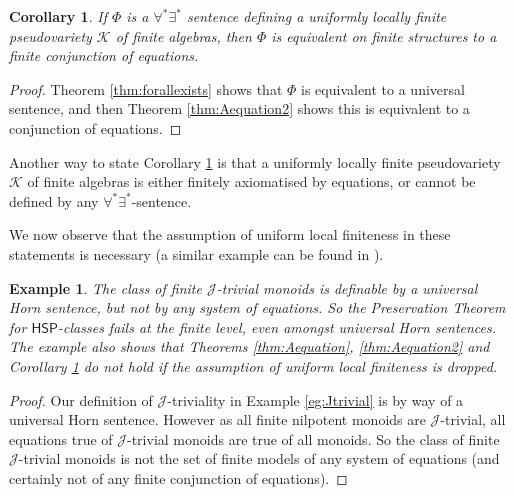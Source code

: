 \documentclass[reqno]{amsart}
\theoremstyle{plain}
\newtheorem{cor}[thm]{Corollary}
\newtheorem{eg}[thm]{Example}
\theoremstyle{definition}
\begin{document}
\begin{cor}\label{cor:compton}
If $\Phi$ is a $\forall^*\exists^*$ sentence defining a uniformly locally finite pseudovariety $\mathscr{K}$ of finite algebras, 
then $\Phi$ is equivalent on finite structures to a finite conjunction of equations.
\end{cor}
\begin{proof}
Theorem \ref{thm:forallexists} shows that $\Phi$ is equivalent to a universal sentence, and then Theorem  \ref{thm:Aequation2} shows this is equivalent to a conjunction of equations.
\end{proof}
Another way to state Corollary \ref{cor:compton} is that a uniformly locally finite pseudovariety~$\mathscr{K}$ of finite algebras is either finitely axiomatised by equations, or cannot be defined by any $\forall^*\exists^*$-sentence.


We now observe that the assumption of uniform local finiteness in these statements is necessary (a similar example can be found in \cite{rosen}).
\begin{eg}\label{eg:Jtrivial2}
The class of finite $\mathcal{J}$-trivial monoids is definable by a universal Horn sentence, but not by any system of equations.  So the Preservation Theorem for $\mathsf{HSP}$-classes fails at the finite level, even amongst universal Horn sentences.  The example also shows that Theorems \ref{thm:Aequation}, \ref{thm:Aequation2} and Corollary \ref{cor:compton} do not hold if the assumption of uniform local finiteness is dropped.
\end{eg}
\begin{proof}
Our definition of $\mathcal{J}$-triviality in Example \ref{eg:Jtrivial} is by way of a universal Horn sentence.  However as all finite nilpotent monoids are $\mathcal{J}$-trivial, all equations true of $\mathcal{J}$-trivial monoids are true of all monoids.  So the class of finite $\mathcal{J}$-trivial monoids is not the set of finite models of any system of equations (and certainly not of any finite conjunction of equations).
\end{proof}
\end{document}
